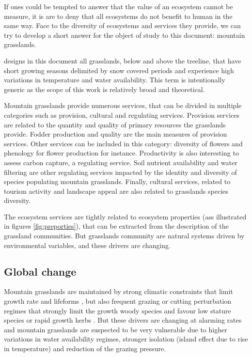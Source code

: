 If ones could be tempted to answer that the value of an ecosystem cannot be measure, it is are to deny that all ecosystems do not benefit to human in the same way. Face to the diversity of ecosystems and services they provide, we can try to develop a short answer for the object of study to this document: mountain grasslands.

 designs in this document all grasslands, below and above the treeline, that have short growing seasons delimited by snow covered periods and experience high variations in temperature and water availability. This term is intentionally generic as the scope of this work is relatively broad and theoretical.

Mountain grasslands provide numerous services, that can be divided in multiple categories such as provision, cultural and regulating services. Provision services are related to the quantity and quality of primary resources the grasslands provide. Fodder production and quality are the main measures of provision services. Other services can be included in this category: diversity of flowers and phenology for flower production for instance. Productivity is also interesting to assess carbon capture, a regulating service. Soil nutrient availability and water filtering are other regulating services impacted by the identity and diversity of species populating mountain grasslands. Finally, cultural services, related to tourism activity and landscape appeal are also related to grasslands species diversity.

The ecosystem services are tightly related to ecosystem properties (ass illustrated in figures \ref{fig:preporties}), that can be extracted from the description of the grassland communities. But grasslands community are natural systems driven by environmental variables, and these drivers are changing.

\subsection{Global change}

Mountain grasslands are maintained by strong climatic constraints that limit growth rate and lifeforms  \parencite{koorner_alpine_2003}, but also frequent grazing or cutting perturbation regimes that strongly limit the growth woody species and favour low stature species or rapid growth herbs \parencite{diaz_plant_2007}. But these drivers are changing at alarming rates and mountain grasslands are suspected to be very vulnerable \parencite{engler_21st_2011} due to higher variations in water availability regimes, stronger isolation (island effect due to rise in temperature) and reduction of the grazing pressure.

